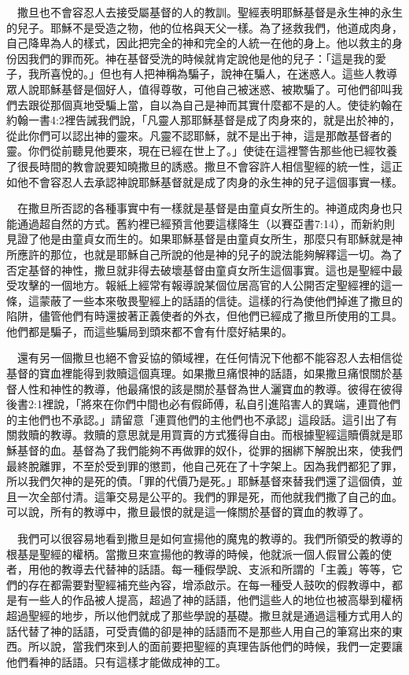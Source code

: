 \documentclass{book}
\begin{document}
　撒旦也不會容忍人去接受屬基督的人的教訓。聖經表明耶穌基督是永生神的永生的兒子。耶穌不是受造之物，他的位格與天父一樣。為了拯救我們，他道成肉身，自己降卑為人的樣式，因此把完全的神和完全的人統一在他的身上。他以救主的身份因我們的罪而死。神在基督受洗的時候就肯定說他是他的兒子：「這是我的愛子，我所喜悅的。」但也有人把神稱為騙子，說神在騙人，在迷惑人。這些人教導眾人說耶穌基督是個好人，值得尊敬，可他自己被迷惑、被欺騙了。可他們卻叫我們去跟從那個真地受騙上當，自以為自己是神而其實什麼都不是的人。使徒約翰在約翰一書4:2裡告誡我們說，「凡靈人那耶穌基督是成了肉身來的，就是出於神的，從此你們可以認出神的靈來。凡靈不認耶穌，就不是出于神，這是那敵基督者的靈。你們從前聽見他要來，現在已經在世上了。」使徒在這裡警告那些他已經牧養了很長時間的教會說要知曉撒旦的誘惑。撒旦不會容許人相信聖經的統一性，這正如他不會容忍人去承認神說耶穌基督就是成了肉身的永生神的兒子這個事實一樣。

　在撒旦所否認的各種事實中有一樣就是基督是由童貞女所生的。神道成肉身也只能通過超自然的方式。舊約裡已經預言他要這樣降生（以賽亞書7:14），而新約則見證了他是由童貞女而生的。如果耶穌基督是由童貞女所生，那麼只有耶穌就是神所應許的那位，也就是耶穌自己所說的他是神的兒子的說法能夠解釋這一切。為了否定基督的神性，撒旦就非得去破壞基督由童貞女所生這個事實。這也是聖經中最受攻擊的一個地方。報紙上經常有報導說某個位居高官的人公開否定聖經裡的這一條，這蒙蔽了一些本來敬畏聖經上的話語的信徒。這樣的行為使他們掉進了撒旦的陷阱，儘管他們有時還披著正義使者的外衣，但他們已經成了撒旦所使用的工具。他們都是騙子，而這些騙局到頭來都不會有什麼好結果的。

　還有另一個撒旦也絕不會妥協的領域裡，在任何情況下他都不能容忍人去相信從基督的寶血裡能得到救贖這個真理。如果撒旦痛恨神的話語，如果撒旦痛恨關於基督人性和神性的教導，他最痛恨的該是關於基督為世人灑寶血的教導。彼得在彼得後書2:1裡說，「將來在你們中間也必有假師傅，私自引進陷害人的異端，連買他們的主他們也不承認。」請留意「連買他們的主他們也不承認」這段話。這引出了有關救贖的教導。救贖的意思就是用買賣的方式獲得自由。而根據聖經這贖價就是耶穌基督的血。基督為了我們能夠不再做罪的奴仆，從罪的捆綁下解脫出來，使我們最終脫離罪，不至於受到罪的懲罰，他自己死在了十字架上。因為我們都犯了罪，所以我們欠神的是死的債。「罪的代價乃是死。」耶穌基督來替我們還了這個債，並且一次全部付清。這筆交易是公平的。我們的罪是死，而他就我們撒了自己的血。可以說，所有的教導中，撒旦最恨的就是這一條關於基督的寶血的教導了。

　我們可以很容易地看到撒旦是如何宣揚他的魔鬼的教導的。我們所領受的教導的根基是聖經的權柄。當撒旦來宣揚他的教導的時候，他就派一個人假冒公義的使者，用他的教導去代替神的話語。每一種假學說、支派和所謂的「主義」等等，它們的存在都需要對聖經補充些內容，增添啟示。在每一種受人鼓吹的假教導中，都是有一些人的作品被人提高，超過了神的話語，他們這些人的地位也被高舉到權柄超過聖經的地步，所以他們就成了那些學說的基礎。撒旦就是通過這種方式用人的話代替了神的話語，可受責備的卻是神的話語而不是那些人用自己的筆寫出來的東西。所以說，當我們來到人的面前要把聖經的真理告訴他們的時候，我們一定要讓他們看神的話語。只有這樣才能做成神的工。
\end{document}
